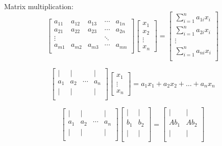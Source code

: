 Matrix multiplication:
\[
	\begin{bmatrix}
	a_{11} & a_{12} & a_{13} & \cdots & a_{1n} \\
	a_{21} & a_{22} & a_{23} & \cdots & a_{2n} \\
	\vdots & &  & \ddots &  \\
	a_{m1} & a_{m2} & a_{m3}& \cdots & a_{mn} \\
	\end{bmatrix}
	\begin{bmatrix}
		x_1 \\ x_2 \\ \vdots \\ x_n
	\end{bmatrix} = 
	\begin{bmatrix}
		\sum_{i=1}^n a_{1i}x_i \\
		\sum_{i=1}^n a_{2i}x_i \\ 
		\vdots \\
		\sum_{i=1}^n a_{ni}x_i\\
	\end{bmatrix}
\]

\[
	\begin{bmatrix}
		| & | &  & | \\
		a_1 & a_2 & \cdots & a_n \\
		| & | &  & | \\
	\end{bmatrix}
		\begin{bmatrix}
		x_1 \\ \vdots \\ x_n
	\end{bmatrix} = 
	a_1x_1+a_2x_2+\dots+a_nx_n
\]

\[
	\begin{bmatrix}
		| & | &  & | \\
		a_1 & a_2 & \cdots & a_n \\
		| & | &  & | \\
	\end{bmatrix}
	\begin{bmatrix}
		| &| \\
		b_1 & b_2 \\
		| & | \\
	\end{bmatrix} = 
	\begin{bmatrix}
		| & | \\
		Ab_1 & Ab_2 \\
		| & | \\
	\end{bmatrix} 
\]

